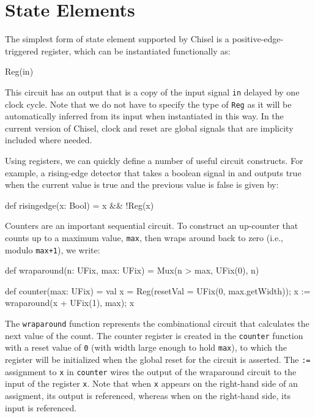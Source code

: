 \documentclass[10pt]{article}
\begin{document}
\section{State Elements}
\label{sec:sequential}


The simplest form of state element supported by Chisel is a
positive-edge-triggered register, which can be instantiated
functionally as:
\begin{scala}
Reg(in)
\end{scala}

\noindent
This circuit has an output that is a copy of the input signal \verb+in+
delayed by one clock cycle.  Note that we do not have to specify the
type of \verb+Reg+ as it will be automatically inferred from its input
when instantiated in this way.  In the current version of Chisel,
clock and reset are global signals that are implicity included where
needed.

Using registers, we can quickly define a number of useful circuit
constructs.  For example, a rising-edge detector that takes a boolean
signal in and outputs true when the current value is true and the
previous value is false is given by:
\begin{scala}
def risingedge(x: Bool) = x && !Reg(x)
\end{scala}

Counters are an important sequential circuit.  To construct an
up-counter that counts up to a maximum value, \verb+max+, then wraps
around back to zero (i.e., modulo \verb!max+1!), we write:
\begin{scala}
def wraparound(n: UFix, max: UFix) =
  Mux(n > max, UFix(0), n)

def counter(max: UFix) = {
  val x = Reg(resetVal = UFix(0, max.getWidth));
  x := wraparound(x + UFix(1), max);
  x
}
\end{scala}

\noindent
The \verb!wraparound! function represents the combinational circuit
that calculates the next value of the count.  The counter register is
created in the \verb!counter! function with a reset value of \verb!0! (with width large enough to hold \verb+max+),
to which the register will be initialized when the global reset for the circuit is asserted.
The \verb!:=! assignment to \verb!x! in \verb!counter! wires the
output of the wraparound circuit to the input of the register
\verb!x!.  Note that when \verb!x! appears on the right-hand side of
an assigment, its output is referenced, whereas when on the right-hand
side, its input is referenced.
\end{document}
